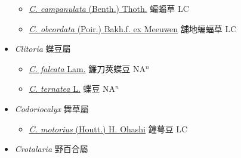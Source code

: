 \begin{itemize}
  \begin{itemize}
        \item[] \href{http://www.theplantlist.org/tpl1.1/search?q=Christia+campanulata}{\textit{C. campanulata} (Benth.) Thoth.}   蝙蝠草 LC
        \item[] \href{http://www.theplantlist.org/tpl1.1/search?q=Christia+obcordata}{\textit{C. obcordata} (Poir.) Bakh.f. ex Meeuwen}   舖地蝙蝠草 LC
  \end{itemize}
 \item[] \textit{Clitoria} 蝶豆屬
                    
  \begin{itemize}
        \item[] \href{http://www.theplantlist.org/tpl1.1/search?q=Clitoria+falcata}{\textit{C. falcata} Lam.}   鐮刀莢蝶豆 NA$^n$
        \item[] \href{http://www.theplantlist.org/tpl1.1/search?q=Clitoria+ternatea}{\textit{C. ternatea} L.}   蝶豆 NA$^n$
  \end{itemize}
 \item[] \textit{Codoriocalyx} 舞草屬
                    
  \begin{itemize}
        \item[] \href{http://www.theplantlist.org/tpl1.1/search?q=Codoriocalyx+motorius}{\textit{C. motorius} (Houtt.) H. Ohashi}     鐘萼豆 LC
  \end{itemize}
 \item[] \textit{Crotalaria} 野百合屬
                    

\end{itemize}
